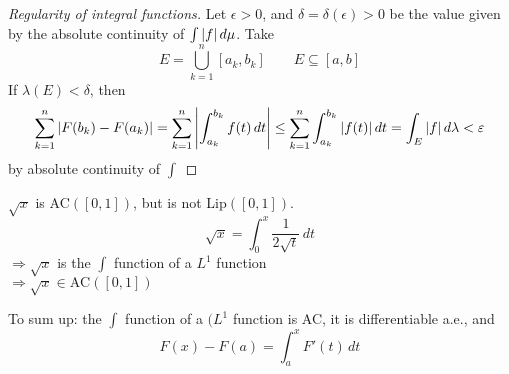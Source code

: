 \begin{proof}[Regularity of integral functions]
    Let \(\epsilon > 0\), and \(\delta = \delta(\epsilon) > 0\) be the value given by the absolute continuity of \(\int \abs{f} \, d\mu\). 
    Take 
    \[
        E = \bigcup_{k=1}^n \left[ a_k, b_k \right] \qquad E \subseteq \left[a, b\right]
    \]
    If \(\lambda(E) < \delta\), then
    \[
        \sum_{k=1}^n \abs{F(b_k) - F(a_k)} = \sum_{k=1}^n \abs{\int_{a_k}^{b_k} f(t)\, dt} 
        \leq \sum_{k=1}^n \int_{a_k}^{b_k} \abs{f(t)}\, dt
        = \int_E \abs{f} \, d\lambda < \varepsilon
    \]
    by absolute continuity of \(\int\) 
\end{proof}
\begin{remark}
    \(\sqrt{x}\) is AC\((\left[0, 1\right])\), but is not Lip\((\left[0, 1\right])\).
    \[
        \sqrt{x} = \int_0^x \frac{1}{2\sqrt{t}} \, dt
    \]
    \(\Rightarrow \sqrt{x}\) is the \(\int\) function of a \(L^1\) function \\
    \(\Rightarrow \sqrt{x} \in \text{AC}(\left[0, 1\right])\)
\end{remark}

To sum up: the \(\int \) function of a \((L^1\) function is AC, it is differentiable a.e., and 
\[
    F(x) - F(a) = \int_a^x F'(t) \, dt \tag*{FC}
\]

